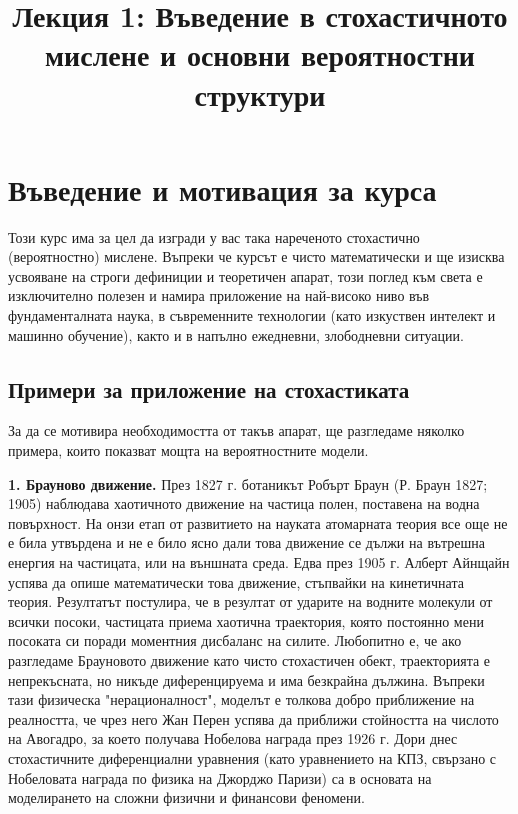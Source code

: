 \documentclass{article}
\title{Лекция 1: Въведение в стохастичното мислене и основни вероятностни структури}
\author{}
\date{}
\begin{document}
\maketitle

\section{Въведение и мотивация за курса}

Този курс има за цел да изгради у вас така нареченото стохастично (вероятностно) мислене. Въпреки че курсът е чисто математически и ще изисква усвояване на строги дефиниции и теоретичен апарат, този поглед към света е изключително полезен и намира приложение на най-високо ниво във фундаменталната наука, в съвременните технологии (като изкуствен интелект и машинно обучение), както и в напълно ежедневни, злободневни ситуации. 

\subsection{Примери за приложение на стохастиката}

За да се мотивира необходимостта от такъв апарат, ще разгледаме няколко примера, които показват мощта на вероятностните модели.

\textbf{1. Брауново движение.} През 1827 г. ботаникът Робърт Браун (Р. Браун 1827; 1905) наблюдава хаотичното движение на частица полен, поставена на водна повърхност. На онзи етап от развитието на науката атомарната теория все още не е била утвърдена и не е било ясно дали това движение се дължи на вътрешна енергия на частицата, или на външната среда. Едва през 1905 г. Алберт Айнщайн успява да опише математически това движение, стъпвайки на кинетичната теория. Резултатът постулира, че в резултат от ударите на водните молекули от всички посоки, частицата приема хаотична траектория, която постоянно мени посоката си поради моментния дисбаланс на силите.
Любопитно е, че ако разгледаме Брауновото движение като чисто стохастичен обект, траекторията е непрекъсната, но никъде диференцируема и има безкрайна дължина. Въпреки тази физическа "нерационалност", моделът е толкова добро приближение на реалността, че чрез него Жан Перен успява да приближи стойността на числото на Авогадро, за което получава Нобелова награда през 1926 г. Дори днес стохастичните диференциални уравнения (като уравнението на КПЗ, свързано с Нобеловата награда по физика на Джорджо Паризи) са в основата на моделирането на сложни физични и финансови феномени.
\end{document}
